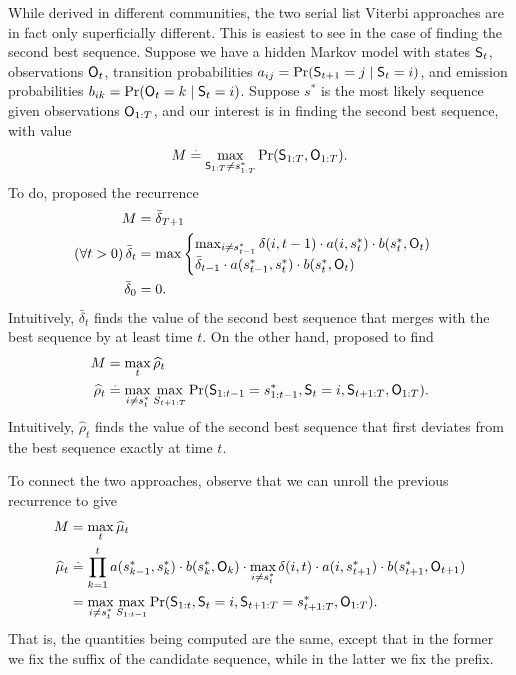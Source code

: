 While derived in different communities, the two serial list Viterbi approaches are in fact only superficially different.
This is easiest to see in the case of finding the second best sequence.
Suppose we have a hidden Markov model with states $\mathsf{S}_{t}$, observations $\mathsf{O}_{t}$, transition probabilities $a_{ij} = \Pr( \mathsf{S}_{t+1} = j \mid \mathsf{S}_t = i )$, and emission probabilities $b_{ik} = \Pr( \mathsf{O}_{t} = k \mid \mathsf{S}_t = i )$.
Suppose $s^*$ is the most likely sequence given observations $\mathsf{O}_{1:T}$,
and our interest is in finding the second best sequence, with value
$$ M \stackrel{.}{=} \max_{\mathsf{S}_{1:T} \neq s^*_{1 : T}}{\Pr( \mathsf{S}_{1:T}, \mathsf{O}_{1:T} )}. $$
To do, \citet{seshadri1994list} proposed the recurrence
\begin{align*}
	M &= \bar{\delta}_{T+1} \\
    (\forall t > 0) \, \bar{\delta}_t &= 
    \max
    \begin{cases}
    \max_{i \neq s^*_{t-1}} \delta(i, t-1) \cdot a( i, s^*_{t} ) \cdot b( s^*_{t}, \mathsf{O}_{t} ) \\
    \bar{\delta}_{t - 1} \cdot a( s^*_{t - 1}, s^*_{t} ) \cdot b( s^*_{t}, \mathsf{O}_{t} )
    \end{cases} \\
    \bar{\delta}_0 &= 0.
\end{align*}
Intuitively, $\bar{\delta}_t$ finds the value of the second best sequence that merges with the best sequence by at least time $t$.
On the other hand, \citet{nilsson2001sequentially} proposed to find
\begin{align*}
	M &= \max_t \widehat{\rho}_t \\
	\widehat{\rho}_{t} &\stackrel{.}{=} \max_{i \neq s^*_{t}} \max_{S_{t+1:T}} {\Pr( \mathsf{S}_{1:t-1} = s^*_{1:t-1}, \mathsf{S}_t = i, \mathsf{S}_{t+1:T}, \mathsf{O}_{1:T} )}.
\end{align*}
Intuitively, $\widehat{\rho}_t$ finds the value of the second best sequence that first deviates from the best sequence exactly at time $t$.

To connect the two approaches, observe that we can unroll the previous recurrence to give
\begin{align*}
	M &= \max_t \widehat{\mu}_t \\
	\widehat{\mu}_{t} &\stackrel{.}{=} \prod_{k = 1}^t a( s^*_{k-1}, s^*_{k} ) \cdot b( s^*_{k}, \mathsf{O}_{k} ) \cdot \max_{i \neq s^*_{t}} \delta(i, t) \cdot a( i, s^*_{t+1} ) \cdot b( s^*_{t+1}, \mathsf{O}_{t+1} ) \\
	&= \max_{i \neq s^*_{t}} \max_{S_{1:t-1}} {\Pr( \mathsf{S}_{1:t}, \mathsf{S}_t = i, \mathsf{S}_{t+1:T} = s^*_{t+1:T}, \mathsf{O}_{1:T} )}.
\end{align*}
That is, the quantities being computed are the same, except that in the former we fix the suffix of the candidate sequence, while in the latter we fix the prefix.
